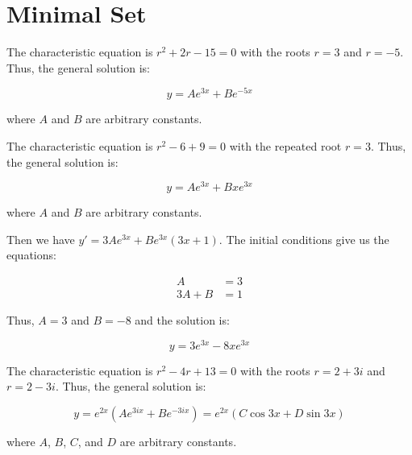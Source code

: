 \documentclass[12pt]{article}
\begin{document}



\pagebreak
\section*{Minimal Set}




The characteristic equation is $r^{2} + 2r - 15 = 0$ with the roots $r = 3$ and $r = -5$. Thus, the general solution is:

\begin{equation}
    y = A e^{3x} + B e^{-5x}
\end{equation}

where $A$ and $B$ are arbitrary constants.


The characteristic equation is $r^{2} - 6 + 9 = 0$ with the repeated root $r = 3$. Thus, the general solution is:

\begin{equation}
    y = A e^{3x} + B xe^{3x}
\end{equation}

where $A$ and $B$ are arbitrary constants.

Then we have $y' = 3A e^{3x} + B e^{3x} (3x + 1)$. The initial conditions give us the equations:

\begin{equation}
    \begin{split}
        A &= 3 \\
        3A + B &= 1
    \end{split}
\end{equation}

Thus, $A = 3$ and $B = -8$ and the solution is:

\begin{equation}
    y = 3 e^{3x} - 8 xe^{3x}
\end{equation}


The characteristic equation is $r^{2} - 4r + 13 = 0$ with the roots $r = 2 + 3i$ and $r = 2 - 3i$. Thus, the general solution is:

\begin{equation}
    y = e^{2x} (A e^{3ix} + B e^{-3ix}) = e^{2x} (C \cos 3x + D \sin 3x)
\end{equation}

where $A$, $B$, $C$, and $D$ are arbitrary constants.
\end{document}
